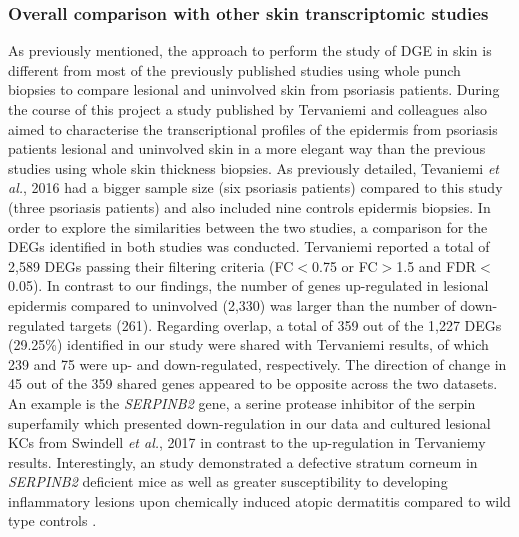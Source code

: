 \subsubsection{Overall comparison with other skin transcriptomic studies}

As previously mentioned, the approach to perform the study of DGE in skin is different from most of the previously published studies using whole punch biopsies to compare lesional and uninvolved skin from psoriasis patients. During the course of this project a study published by Tervaniemi and colleagues also aimed to characterise the transcriptional profiles of the epidermis from psoriasis patients lesional and uninvolved skin in a more elegant way than the previous studies using whole skin thickness biopsies.  As previously detailed, Tevaniemi \textit{et al.}, 2016 had a bigger sample size (six psoriasis patients) compared to this study (three psoriasis patients) and also included nine controls epidermis biopsies. In order to explore the similarities between the two studies, a comparison for the DEGs identified in both studies was conducted. Tervaniemi reported a total of 2,589 DEGs passing their filtering criteria (FC$<$0.75 or FC$>$1.5 and FDR$<$0.05). In contrast to our findings, the number of genes up-regulated in lesional epidermis compared to uninvolved (2,330) was larger than the number of down-regulated targets (261). Regarding overlap, a total of 359 out of the 1,227 DEGs (29.25\%) identified in our study were shared with Tervaniemi results, of which 239 and 75 were up- and down-regulated, respectively. The direction of change in 45 out of the 359 shared genes appeared to be opposite across the two datasets. An example is the \textit{SERPINB2} gene, a serine protease inhibitor of the serpin superfamily which presented down-regulation in our data and cultured lesional KCs from Swindell \textit{et al.}, 2017 in contrast to the up-regulation in Tervaniemy results. Interestingly, an study demonstrated a defective stratum corneum in \textit{SERPINB2} deficient mice as well as greater susceptibility to developing inflammatory lesions upon chemically induced atopic dermatitis compared to wild type controls \parencite{Schroder2016}.   


